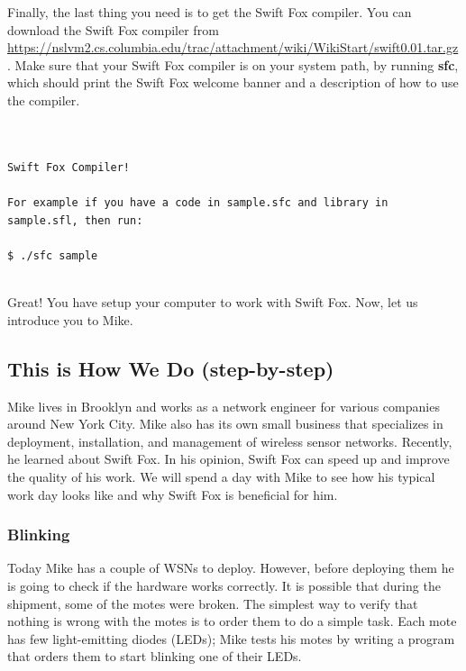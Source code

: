 Finally, the last thing you need is to get the Swift Fox compiler. You can
download the Swift Fox compiler from 
\url{https://nslvm2.cs.columbia.edu/trac/attachment/wiki/WikiStart/swift0.01.tar.gz}. 
Make sure that your Swift Fox compiler is on your system path, by running
\textbf{sfc}, which should print the Swift Fox welcome banner and a
description of how to use the compiler.

\texttt{\\
\\
\hspace*{4cm} Swift Fox Compiler!\\
\\
For example if you have a code in sample.sfc and library in sample.sfl, then run:\\
\\
\$ ./sfc sample\\
\\
}

Great! You have setup your computer to work with Swift Fox. Now, let us
introduce you to Mike.


\subsection{This is How We Do (step-by-step)}

Mike lives in Brooklyn and works as a network engineer for various
companies around New York City. Mike also has its own small business that
specializes in deployment, installation, and management of wireless sensor 
networks. Recently, he learned about Swift Fox. In his opinion, Swift Fox
can speed up and improve the quality of his work. We will spend a day with 
Mike to see how his typical work day looks like and why Swift Fox is
beneficial for him.

\subsubsection{Blinking}

Today Mike has a couple of WSNs to deploy. However, before deploying them
he is going to check if the hardware works correctly. It is possible that
during the shipment, some of the motes were broken. The simplest way to
verify that nothing is wrong with the motes is to order them to do a simple
task. Each mote has few light-emitting diodes (LEDs); Mike tests his motes 
by writing a program that orders them to start blinking one of their LEDs.


